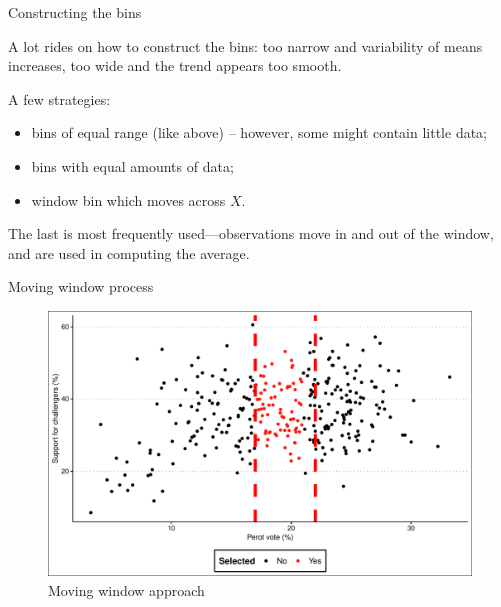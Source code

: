 \documentclass[12pt,english,pdf,xcolor=dvipsnames,aspectratio=169,handout]{beamer}\usepackage[]{graphicx}\usepackage[]{xcolor}
\begin{document}
\begin{frame}{Constructing the bins}

A lot rides on how to construct the bins: too narrow and variability of means increases, too wide and the trend appears too smooth.\bigskip

A few strategies:

\begin{itemize}
\item bins of equal range (like above) -- however, some might contain little data;
\item bins with equal amounts of data;
\item window bin which moves across $X$.
\end{itemize}\bigskip

The last is most frequently used---observations move in and out of the window, and are used in computing the average.

\end{frame}



\begin{frame}{Moving window process}



\begin{figure}
  \centering
  \includegraphics[scale=0.5]{../04-graphs/04-04}
  \caption{Moving window approach}
\end{figure}

\end{frame}
\end{document}
